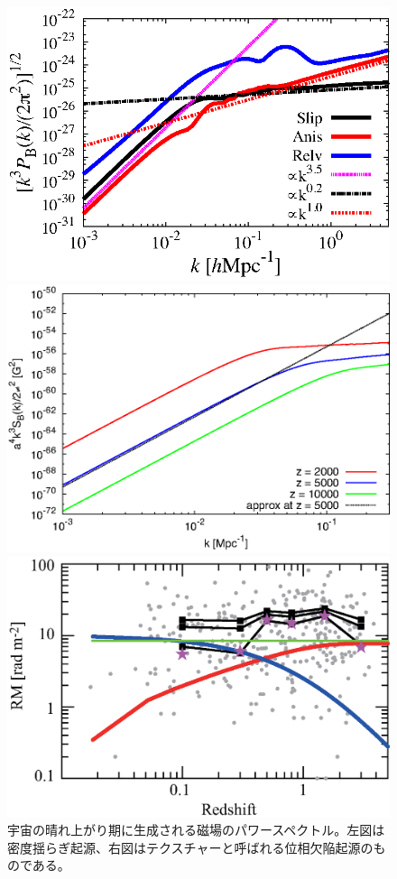 \begin{figure}[tbp]
\begin{minipage}[c]{0.5\textwidth}
\centering
\includegraphics[width=\linewidth]{magnetism/c06.s3.ss10.f1a.eps} 
\end{minipage}
\begin{minipage}[c]{0.5\textwidth}
\centering
\includegraphics[width=\linewidth]{magnetism/c06.s3.ss10.f1b.eps} 
\end{minipage}
\caption{宇宙の晴れ上がり期に生成される磁場のパワースペクトル。左図は密度揺らぎ起源、右図はテクスチャーと呼ばれる位相欠陥起源のものである。
}\label{c06.s3.ss10.f1}
\begin{center}
\includegraphics[width=0.8\linewidth]{magnetism/c06.s3.ss11.f1.eps}

\end{center}
\end{figure}
